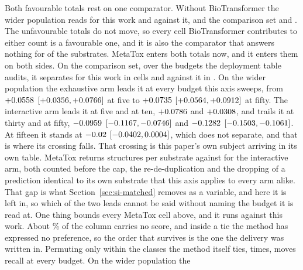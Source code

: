 \documentclass[journal=jcisd8,manuscript=suppinfo,layout=onecolumn]{achemso}
\begin{document}
Both favourable totals rest on one comparator. Without BioTransformer the wider population reads
\numPopdefWithoutbtforwholeWord{} for this work and \numPopdefWithoutbtagainstwholeWord{} against
it, and the comparison set \numPopdefWithoutbtforcompWord{} and
\numPopdefWithoutbtagainstcompWord{}. The unfavourable totals do not move, so every cell
BioTransformer contributes to either count is a favourable one, and it is also the comparator that
answers nothing for \numPopdefBtsilent{} of the \numPopdefWholesubs{} substrates. MetaTox enters
both totals now, and it enters them on both sides. On the comparison set, over the
\numPopdefMetatoxbudgetsWord{} budgets the deployment table audits, it separates for this work in
\numPopdefMetatoxforWord{} cells and against it in \numPopdefMetatoxagainstWord{}. On the wider
population the exhaustive arm leads it at every budget this axis sweeps, from
$+0.0558$ $[+0.0356,
+0.0766]$ at five to $+0.0735$
$[+0.0564, +0.0912]$ at fifty. The
interactive arm leads it at five and at ten, $+0.0786$ and
$+0.0308$, and trails it at thirty and at fifty,
$-0.0959$ $[-0.1167,
-0.0746]$ and $-0.1282$
$[-0.1503, -0.1061]$. At fifteen it stands at
$-0.02$ $[-0.0402,
0.0004]$, which does not separate, and that is where its crossing
falls. That crossing is this paper's own subject arriving in its own
table. MetaTox returns \numPopdefMetatoxcolumnoutput{} structures per substrate against
\numPopdefDeployedpoolwhole{} for the interactive arm, both counted before the cap, the
re-de-duplication and the dropping of a prediction identical to its own substrate that this axis
applies to every arm alike. That gap is what Section~\ref{sec:si-matched} removes as a variable,
and here it is left in, so which of the two leads cannot be said without naming the budget it is
read at. One thing bounds every MetaTox cell above, and it
runs against this work. About \numPopdefMetatoxscoredshare{}\% of the column carries no score, and
inside a tie the method has expressed no preference, so the order that survives is the one the
delivery was written in. Permuting only within the classes the method itself ties,
\numPopdefTiebreakperms{} times, moves recall at every budget. On the wider population the
\end{document}
